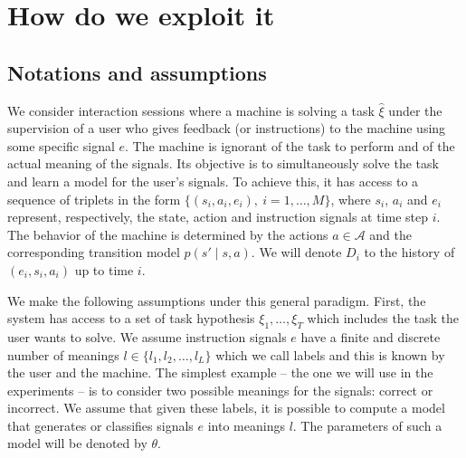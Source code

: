\section{How do we exploit it}

\subsection{Notations and assumptions}

We consider interaction sessions where a machine is solving a task $\hat{\xi}$ under the supervision of a user who gives feedback (or instructions) to the machine using some specific signal $e$. The machine is ignorant of the task to perform and of the actual meaning of the signals. Its objective is to simultaneously solve the task and learn a model for the user's signals. To achieve this, it has access to a sequence of triplets in the form $\{(s_i, a_i, e_i),\ i = 1,\ldots,M\}$, where $s_i$, $a_i$ and $e_i$ represent, respectively, the state, action and instruction signals at time step $i$. The behavior of the machine is determined by the actions $a\in\mathcal{A}$ and the corresponding transition model $p(s'\mid s,a)$.  We will denote $D_i$ to the history of $(e_i, s_i, a_i)$ up to time $i$.


We make the following assumptions under this general paradigm. First, the system has access to a set of task hypothesis $\xi_1,\ldots,\xi_T$ which includes the task the user wants to solve. We assume instruction signals $e$ have a finite and discrete number of meanings $l \in \{l_1, l_2, \ldots, l_L\}$ which we call labels and this is known by the user and the machine. The simplest example -- the one we will use in the experiments -- is to consider two  possible meanings for the signals: correct or incorrect. We assume that given these labels, it is possible to compute a model that generates or classifies signals $e$ into meanings $l$. The parameters of such a model will be denoted by $\theta$.


 

